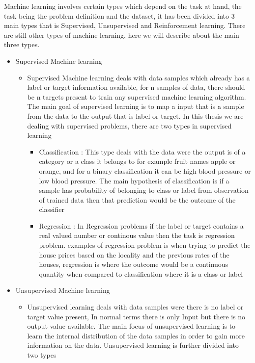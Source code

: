 Machine learning involves certain types which depend on the task at hand, the task being the problem definition and the dataset, it has been divided into 3 main types that is Supervised, Unsupervised and Reinforcement learning. There are still other types of machine learning, here we will describe about the main three types.
\begin{itemize}
    \item Supervised Machine learning
     \begin{itemize}
        
         \item Supervised Machine learning deals with data samples which already has a label or target information available, for n samples of data, there should be n targets present to train any supervised machine learning algorithm. The main goal of supervised learning is to map a input that is a sample from the data to the output that is label or target. In this thesis we are dealing with supervised problems, there are two types in supervised learning
        
         \begin{itemize}
             \item Classification : This type deals with the data were the output is of a category or a class it belongs to for example fruit names apple or orange, and for a binary classification it can be high blood pressure or low blood pressure. The main hypothesis of classification is if a sample has probability of belonging to class or label from observation of trained data then that prediction would be  the outcome of the classifier 
             
             \item Regression : In Regression problems if the label or target contains a real valued number or continous value then the task is regression problem. examples of regression problem is when trying to predict the house prices based on the locality and the previous rates of the houses, regression is where the outcome would be a continuous quantity when compared to classification where it is a class or label
         \end{itemize}
         
     \end{itemize} 
     
     \item Unsupervised Machine learning
     
     \begin{itemize}
         \item Unsupervised learning deals with data samples were there is no label or target value present, In normal terms there is only Input but there is no output value available. The main focus of unsupervised learning is to learn the internal distribution of the data samples in order to gain more information on the data. Unsupervised learning is further divided into two types
         

\end{itemize}
\end{itemize}
